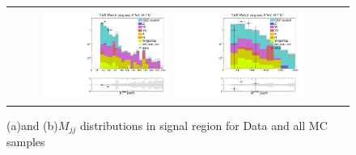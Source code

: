    \begin{table}[ht]
     \caption{\label{table:SReventcount}Number on events in SR data and all MC samples. The QCD prediction has been corrected for the unidirectional MET-bias described in section \ref{dihad:subsec:stability} for the combination of the systematic errors.}
   \end{table}
   
       \begin{figure}[tbh!]
           \centering
           \begin{tabular}{cc}
             \includegraphics[width=0.40\textwidth]{PLOTS/diTauHadLSQCDPlots/UnblindedUpdate/LS_SR/LS_SignalRegion/h_met_log.pdf}
             \includegraphics[width=0.40\textwidth]{PLOTS/diTauHadLSQCDPlots/UnblindedUpdate/LS_SR/LS_SignalRegion/h_dijetinvariantmass_log.pdf}
           \end{tabular}
           \caption{(a)\met and (b)$M_{jj}$ distributions in signal region for Data and all MC samples}
           \label{fig:LS_SR_h_met_dijetinvariantmass_log}
         \end{figure}

